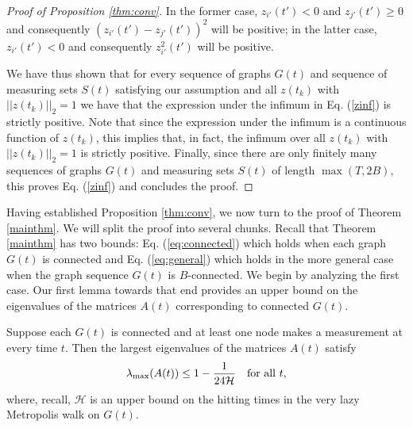 \documentclass[final]{siamltex}
\begin{document}
\begin{proof}[Proof of {{{Proposition}}} \ref{thm:conv}]
In the former case, $z_{i'}(t')<0$ and $z_{j'}(t') \geq 0$ and consequently $(z_{i'}(t')-z_{j'}(t'))^2$ will be positive; in the latter case, $z_{i'}(t')<0$ and consequently
$z_{i'}^2(t')$ will be positive. 

We have thus shown that for every sequence of graphs $G(t)$ and sequence of measuring sets $S(t)$ satisfying our assumption and all $z(t_k)$ with $||z(t_k)||_2 = 1$ we have that the expression under the infimum in Eq. (\ref{zinf}) is strictly positive. Note that since the expression under the infimum is a continuous function of $z(t_k)$, this implies that, in fact, the infimum over all $z(t_k)$ with $||z(t_k)||_2=1$ is strictly positive. Finally, since there are only finitely many sequences of graphs $G(t)$ and measuring sets $S(t)$ of length $\max(T,2B)$, this proves Eq. (\ref{zinf}) and concludes the proof. 
\end{proof}

\smallskip Having established Proposition \ref{thm:conv}, we now turn to the proof of Theorem \ref{mainthm}. We will split the proof into several chunks. Recall
that Theorem \ref{mainthm} has two bounds: Eq. (\ref{eq:connected}) which holds when each graph $G(t)$ is connected and Eq. (\ref{eq:general}) which holds
in the more general case when the graph sequence $G(t)$ is $B$-connected. We begin by analyzing the first case. Our first lemma towards that end
 provides an upper bound on the eigenvalues of the matrices $A(t)$ corresponding to connected $G(t)$. 

\smallskip

\begin{lemma} Suppose each $G(t)$ is connected and at least one node makes a measurement at every time $t$. Then the largest eigenvalues of the matrices $A(t)$ satisfy  $$\lambda_{\rm max}(A(t)) \leq 1 - \frac{1}{24 \mathcal{H}} ~~ \mbox{ for all } t,$$ \label{conneig}
\noindent where, recall, $\mathcal{H}$ is an upper bound on the hitting times in the very lazy Metropolis walk on $G(t)$. 
\end{lemma}

\smallskip
\end{document}
